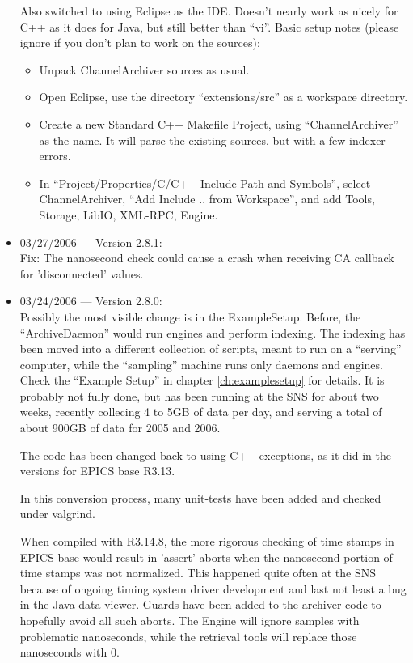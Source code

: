 \begin{itemize}
Also switched to using Eclipse as the IDE.
Doesn't nearly work as nicely for C++ as it does for Java,
but still better than ``vi''.
Basic setup notes (please ignore if you don't plan to work
on the sources):
\begin{itemize}
\item Unpack ChannelArchiver sources as usual.
\item Open Eclipse, use the directory ``extensions/src'' as a
      workspace directory.
\item Create a new Standard C++ Makefile Project, using
      ``ChannelArchiver'' as the name. It will parse the existing
      sources, but with a few indexer errors.
\item In ``Project/Properties/C/C++ Include Path and Symbols'',
      select ChannelArchiver, ``Add Include .. from Workspace'',
      and add Tools, Storage, LibIO, XML-RPC, Engine.
\end{itemize}

\item 03/27/2006 --- Version 2.8.1:\\
Fix: The nanosecond check could cause a crash when receiving
CA callback for 'disconnected' values.

\item 03/24/2006 --- Version 2.8.0:\\
Possibly the most visible change is in the ExampleSetup.
Before, the ``ArchiveDaemon'' would run engines and perform indexing.
The indexing has been moved into a different collection of scripts,
meant to run on a ``serving'' computer, while the ``sampling'' machine
runs only daemons and engines.
Check the ``Example Setup'' in chapter \ref{ch:examplesetup} for details.
It is probably not fully done, but has been running at the SNS for
about two weeks, recently collecing 4 to 5GB of data per day,
and serving a total of about 900GB of data for 2005 and 2006.

The code has been changed back to using C++ exceptions, as it did in
the versions for EPICS base R3.13.

In this conversion process, many unit-tests have been added
and checked under valgrind.

When compiled with R3.14.8, the more rigorous checking of time stamps
in EPICS base would result in 'assert'-aborts when the
nanosecond-portion of time stamps was not normalized.
This happened quite often at the SNS because of ongoing timing system driver
development and last not least a bug in the Java data viewer.
Guards have been added to the archiver code to hopefully avoid all
such aborts.
The Engine will ignore samples with problematic nanoseconds,
while the retrieval tools will replace those nanoseconds with 0.


\end{itemize}
